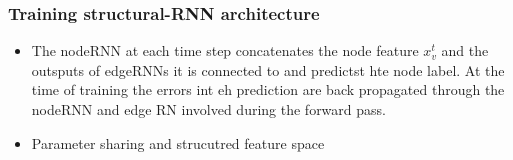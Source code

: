 \documentclass{article}
\begin{document}
\subsubsection{Training structural-RNN architecture}
\begin{itemize}
\item The nodeRNN at each time step concatenates the node feature $x_v^t$ and the outsputs of edgeRNNs it is connected to and predictst hte node label. At the time of training the errors int eh prediction are back propagated through the nodeRNN and edge RN involved during the forward pass.
\item Parameter sharing and strucutred feature space
\end{itemize}







\end{document}
